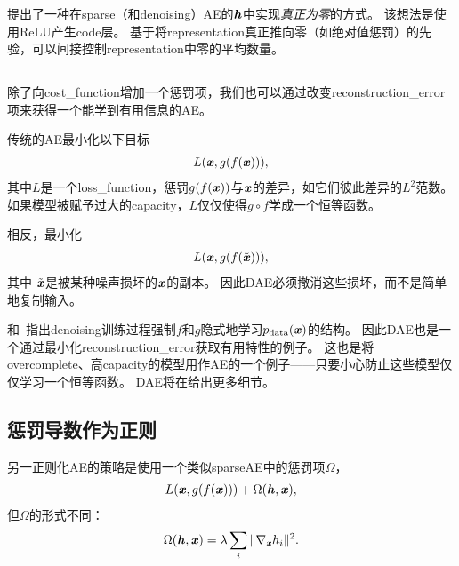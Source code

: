\citet{Glorot+al-ICML-2011-small}提出了一种在\gls{sparse}（和\gls{denoising}）\gls{AE}的$\boldsymbol{\mathit{h}}$中实现\emph{真正为零}的方式。
该想法是使用\gls{ReLU}产生\gls{code}层。
基于将\gls{representation}真正推向零（如绝对值惩罚）的先验，可以间接控制\gls{representation}中零的平均数量。



\subsection{}
\label{sec:sub_denoising_autoencoders}
除了向\gls{cost_function}增加一个惩罚项，我们也可以通过改变\gls{reconstruction_error}项来获得一个能学到有用信息的\gls{AE}。


传统的\gls{AE}最小化以下目标
\begin{align}
    L(\boldsymbol{\mathit{x}}, g(f(\boldsymbol{\mathit{x}}))),
\end{align}
其中$L$是一个\gls{loss_function}，惩罚$g(f(\boldsymbol{\mathit{x}}))$与$\boldsymbol{\mathit{x}}$的差异，如它们彼此差异的$L^2$范数。
如果模型被赋予过大的\gls{capacity}，$L$仅仅使得$g \circ  f$学成一个恒等函数。


相反，最小化 
\begin{align}
    L(\boldsymbol{\mathit{x}}, g(f(\tilde {\boldsymbol{\mathit{x}}}))),
\end{align}
其中 $\tilde {\boldsymbol{\mathit{x}}}$是被某种噪声损坏的$\boldsymbol{\mathit{x}}$的副本。
因此\gls{DAE}必须撤消这些损坏，而不是简单地复制输入。

\citet{Alain+Bengio-ICLR2013-small}和~\citet{Bengio-et-al-NIPS2013-small}指出\gls{denoising}训练过程强制$f$和$g$隐式地学习$p_{\text{data}} (\boldsymbol{\mathit{x}})$的结构。
因此\gls{DAE}也是一个通过最小化\gls{reconstruction_error}获取有用特性的例子。
这也是将\gls{overcomplete}、高\gls{capacity}的模型用作\gls{AE}的一个例子——只要小心防止这些模型仅仅学习一个恒等函数。
\gls{DAE}将在给出更多细节。


\subsection{惩罚导数作为正则}
\label{sec:regularizing_by_penalizing_derivatives}
另一正则化\gls{AE}的策略是使用一个类似\gls{sparse}\gls{AE}中的惩罚项$\Omega$，
\begin{align}
    L(\boldsymbol{\mathit{x}}, g(f(\boldsymbol{\mathit{x}}))) + \Omega(\boldsymbol{\mathit{h}}, \boldsymbol{\mathit{x}}),
\end{align}
但$\Omega$的形式不同：
\begin{align}
\Omega(\boldsymbol{\mathit{h}}, \boldsymbol{\mathit{x}}) = \lambda \sum_i \| \nabla_{\boldsymbol{\mathit{x}}}h_i \|^2.
\end{align}


